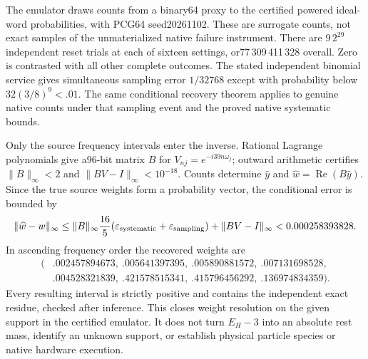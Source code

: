 The emulator draws counts from a binary64 proxy to the certified powered
ideal-word probabilities, with PCG64 seed20261102.  These are surrogate
counts, not exact samples of the unmaterialized native failure instrument.
There are $9\,2^{29}$ independent reset trials at each of sixteen settings,
or77\,309\,411\,328 overall.  Zero is contrasted with all other complete
outcomes.  The stated independent binomial service gives simultaneous
sampling error $1/32768$ except with probability below $32(3/8)^9<.01$.
The same conditional recovery theorem applies to genuine native counts
under that sampling event and the proved native systematic bounds.

Only the source frequency intervals enter the inverse.  Rational Lagrange
polynomials give a96-bit matrix $B$ for $V_{nj}=e^{-i39n\omega_j}$;
outward arithmetic certifies $\|B\|_\infty<2$ and
$\|BV-I\|_\infty<10^{-18}$.  Counts determine $\widehat y$ and
$\widehat w=\operatorname{Re}(B\widehat y)$.  Since the true source weights
form a probability vector, the conditional error is bounded by
\[
 \|\widehat w-w\|_\infty
 \leq\|B\|_\infty\frac{16}{5}
       (\varepsilon_{\rm systematic}+\varepsilon_{\rm sampling})
       +\|BV-I\|_\infty
 <0.000258393828.
\]
In ascending frequency order the recovered weights are
\[
\begin{split}
(&.002457894673,\ .005641397395,\ .005890881572,\ .007131698528,\\
 &.004528321839,\ .421578515341,\ .415796456292,\ .136974834359).
\end{split}
\]
Every resulting interval is strictly positive and contains the independent
exact residue, checked after inference.  This closes weight resolution on
the given support in the certified emulator.  It does not turn $E_H-3$
into an absolute rest mass, identify an unknown support, or establish
physical particle species or native hardware execution.
